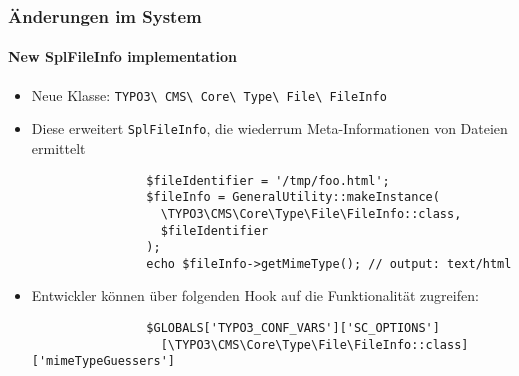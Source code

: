 
\begin{frame}[fragile]
	\frametitle{Änderungen im System}
	\framesubtitle{New SplFileInfo implementation}

	\lstset{basicstyle=\smaller\ttfamily}

	\begin{itemize}

		\item Neue Klasse:
			\texttt{TYPO3\textbackslash
				CMS\textbackslash
				Core\textbackslash
				Type\textbackslash
				File\textbackslash
				FileInfo}

		\item Diese erweitert \texttt{SplFileInfo}, die wiederrum Meta-Informationen von Dateien ermittelt

			\begin{lstlisting}
				$fileIdentifier = '/tmp/foo.html';
				$fileInfo = GeneralUtility::makeInstance(
				  \TYPO3\CMS\Core\Type\File\FileInfo::class,
				  $fileIdentifier
				);
				echo $fileInfo->getMimeType(); // output: text/html
			\end{lstlisting}

		\item Entwickler können über folgenden Hook auf die Funktionalität zugreifen:

			\begin{lstlisting}
				$GLOBALS['TYPO3_CONF_VARS']['SC_OPTIONS']
				  [\TYPO3\CMS\Core\Type\File\FileInfo::class]['mimeTypeGuessers']
			\end{lstlisting}

	\end{itemize}

\end{frame}


